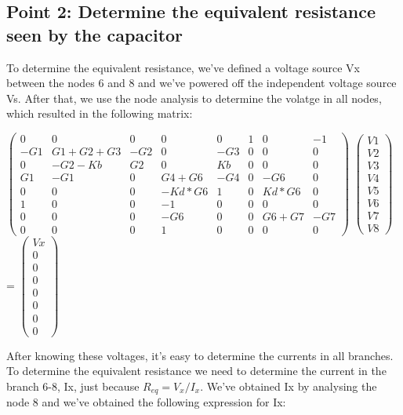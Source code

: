 \subsection{Point 2: Determine the equivalent resistance seen by the capacitor}

\setlength{\parskip}{1em}

To determine the equivalent resistance, we've defined a voltage source Vx between the nodes 6 and 8 and we've powered off the independent voltage source Vs. After that, we use the node analysis to determine the volatge in all nodes, which resulted in the following matrix:

\setlength{\parskip}{4em}

$\begin{pmatrix}
0 & 0 & 0 & 0 & 0 & 1 & 0 & -1\\
-G1 & G1+G2+G3 & -G2 & 0 & -G3 & 0 & 0 & 0\\
0 & -G2-Kb & G2 & 0 & Kb & 0 & 0 & 0 \\
G1 & -G1 & 0 & G4+G6 & -G4 & 0 & -G6 & 0\\
0 & 0 & 0 & -Kd*G6 & 1 & 0 & Kd*G6 & 0 \\
1 & 0 & 0 & -1 & 0 & 0 & 0 & 0\\
0 & 0 & 0 & -G6 & 0 & 0 & G6+G7 & -G7  \\ 
0 & 0 & 0 & 1 & 0 & 0 & 0 & 0
\end{pmatrix}$
$\begin{pmatrix}
V1\\
V2\\
V3\\
V4\\
V5\\
V6\\
V7\\
V8
\end{pmatrix}$
=
$\begin{pmatrix}
Vx\\
0\\
0\\
0\\
0\\
0\\
0\\
0
\end{pmatrix}$

After knowing these voltages, it's easy to determine the currents in all branches. To determine the equivalent resistance we need to determine the current in the branch 6-8, Ix, just because $R_{eq}=V_{x}/I_{x}$. We've obtained Ix by analysing the node 8 and we've obtained the following expression for Ix:

